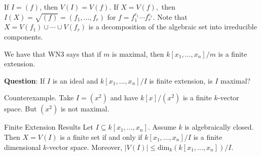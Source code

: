 \documentclass{report}
\begin{document}
If $I = (f)$, then $V(I) = V(f)$. If $X = V(f),$ then $I(X) = \sqrt{(f)} = (f_{1}, \ldots , f_{r})$ for $f = f_{1}^{e_{1}}\cdots f_{r}^{e_{r}}$. Note that $X = V(f_{1}) \cup  \cdots \cup V(f_{r})$ is a decomposition of the algebraic set into irreducible components.

We have that WN3 says that if $m$ is maximal, then $k[x_{1}, \ldots , x_{n}]/m$ is a finite extension. 

\textbf{Question}: If $I$ is an ideal and $k[x_{1}, \ldots , x_{n}]/I$ is finite extension, is $I$ maximal?
    \begin{answer}
        Counterexample. Take $I = (x^{2})$ and have $k[x]/(x^{2})$ is a finite $k$-vector space. But $(x^{2})$ is not maximal.
    \end{answer}

\begin{theorem}{Finite Extension Results}
    Let $I \subseteq k[x_{1}, \ldots , x_{n}]$. Assume $k$ is algebraically closed. Then $X = V(I)$ is a finite set if and only if $k[x_{1}, \ldots , x_{n}]/I$ is a finite dimensional $k$-vector space. Moreover, $\lvert V(I) \rvert \leq \text{dim}_{k}(k[x_{1}, \ldots , x_{n}])/I$.
\end{theorem}
\end{document}
